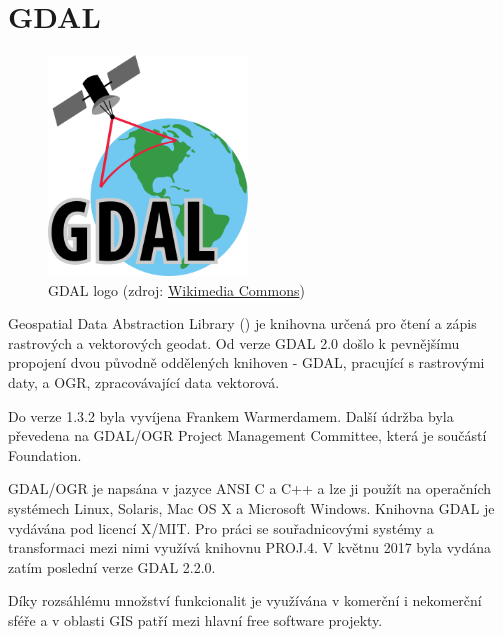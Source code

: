   
\section{GDAL}

\begin{figure}[H] \centering
      \includegraphics[width=150pt]{./pictures/gdal_logo.png}
      \caption[GDAL logo]{GDAL logo (zdroj:
\href{https://cs.wikipedia.org/wiki/Soubor:GDALLogoColor.svg}{Wikimedia Commons})}
      \label{fig:gdal}
  \end{figure}
  
Geospatial Data Abstraction Library () je knihovna určená pro
čtení a zápis rastrových a vektorových geodat. Od verze GDAL 2.0 došlo
k pevnějšímu propojení dvou původně oddělených knihoven - GDAL,
pracující s rastrovými daty, a OGR, zpracovávající data vektorová.

Do verze 1.3.2 byla vyvíjena Frankem Warmerdamem. Další údržba byla
převedena na GDAL/OGR Project Management Committee, která je součástí
 Foundation.

GDAL/OGR je napsána v jazyce ANSI C a C++ a lze ji použít na
operačních systémech Linux, Solaris, Mac OS X a Microsoft
Windows. Knihovna GDAL je vydávána pod licencí X/MIT. Pro práci se
souřadnicovými systémy a transformaci mezi nimi využívá knihovnu
PROJ.4. V květnu 2017 byla vydána zatím poslední verze GDAL 2.2.0. 
\cite{gdal}

Díky rozsáhlému množství funkcionalit je využívána v komerční i
nekomerční sféře a v oblasti GIS patří mezi hlavní free software
projekty.


